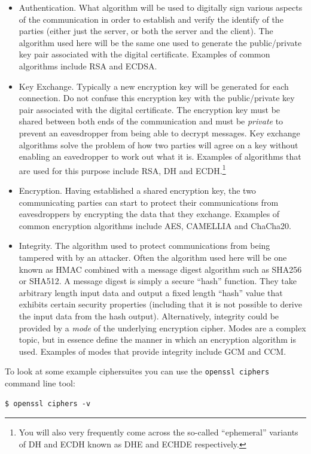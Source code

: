 \begin{itemize}
\item Authentication. What algorithm will be used to digitally sign various 
aspects of the communication in order to establish and verify the identify of
the parties (either just the server, or both the server and the client). The 
algorithm used here will be the same one used to generate the public/private 
key pair associated with the digital certificate. Examples of common algorithms 
include RSA and ECDSA.
\item Key Exchange. Typically a new encryption key will be generated for each
connection. Do not confuse this encryption key with the public/private key pair
associated with the digital certificate. The encryption key must be shared
between both ends of the communication and must be \emph{private} to prevent an
eavesdropper from being able to decrypt messages. Key exchange algorithms solve 
the problem of how two parties will agree on a key without enabling an 
eavedropper to work out what it is. Examples of algorithms that are used for 
this purpose include RSA, DH and ECDH.\footnote{You will also very
frequently come across the so-called ``ephemeral'' variants of DH and ECDH
known as DHE and ECHDE respectively.}
\item Encryption. Having established a shared encryption key, the two 
communicating parties can start to protect their communications from 
eavesdroppers by encrypting the data that they exchange. Examples of common 
encryption algorithms include AES, CAMELLIA and ChaCha20.
\item Integrity. The algorithm used to protect communications from being 
tampered with by an attacker. Often the algorithm used here will be one known 
as HMAC combined with a message digest algorithm such as SHA256 or SHA512. A
message digest is simply a secure ``hash'' function. They take arbitrary 
length input data and output a fixed length ``hash'' value that exhibits 
certain security properties (including that it is not possible to derive the 
input data from the hash output). Alternatively, integrity could be provided by
a \emph{mode} of the underlying  encryption cipher. Modes are a complex topic,
but in essence define the manner in which an encryption algorithm is used.
Examples of modes that provide integrity include GCM and CCM.
\end{itemize}

To look at some example ciphersuites you can use the \lstinline!openssl ciphers!
command line tool:
\begin{verbatim}
$ openssl ciphers -v
\end{verbatim}

